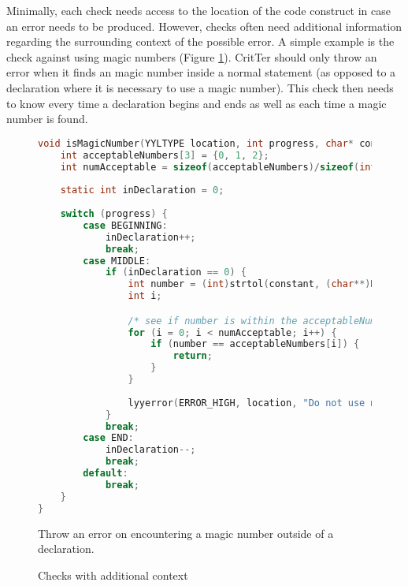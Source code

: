 \documentclass[12pt]{report}
\def\lstlistingname{Figure}
\newcommand{\refCode}{\lstlistingname \hspace{1mm}}
\newcommand{\programName}{CritTer\xspace}
\begin{document}
Minimally, each check needs access to the location of the code construct in case an error needs to be 
produced. However, checks often need additional information regarding the surrounding context of 
the possible error. A simple example is the check against using magic numbers (\refCode 
\ref{checkWithContext}). \programName should only throw an error when it finds an magic number 
inside a normal statement (as opposed to a declaration where it is necessary to use a magic number). 
This check then needs to know every time a declaration begins and ends as well as each time a 
magic number is found.

\begin{figure}
\caption{Checks with additional context}
\label{checkWithContext}
\begin{lstlisting}[language=C]
void isMagicNumber(YYLTYPE location, int progress, char* constant) {
	int acceptableNumbers[3] = {0, 1, 2};
	int numAcceptable = sizeof(acceptableNumbers)/sizeof(int);
	
	static int inDeclaration = 0;
	
	switch (progress) {
		case BEGINNING:
			inDeclaration++;
			break;
		case MIDDLE:
			if (inDeclaration == 0) {
				int number = (int)strtol(constant, (char**)NULL, 0);
				int i;

				/* see if number is within the acceptableNumbers array */
				for (i = 0; i < numAcceptable; i++) {
					if (number == acceptableNumbers[i]) {
						return;
					}
				}
				
				lyyerror(ERROR_HIGH, location, "Do not use magic numbers");
			}
			break;
		case END:
			inDeclaration--;
			break;
		default:
			break;
	}
}
\end{lstlisting}
\small{Throw an error on encountering a magic number outside of a declaration.}
\end{figure}



\nocite{*}


\end{document}
